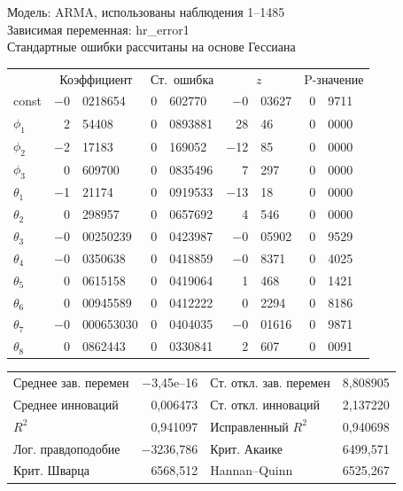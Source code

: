 \documentclass[a4paper,12pt]{article}
\begin{document}
\begin{table}[H]
	\begin{center}
		
		Модель: ARMA, использованы наблюдения 1--1485\\
		Зависимая переменная: hr\_error1\\
		Стандартные ошибки рассчитаны на основе Гессиана
		
		\vspace{1em}
		
		\begin{tabular}{lr@{,}lr@{,}lr@{,}lr@{,}l}
			&
			\multicolumn{2}{c}{Коэффициент} &
			\multicolumn{2}{c}{Ст.\ ошибка} &
			\multicolumn{2}{c}{$z$} &
			\multicolumn{2}{c}{P-значение} \\[1ex]
			const &
			$-$0&0218654 &
			0&602770 &
			$-$0&03627 &
			0&9711 \\
			$\phi_{1}$ &
			2&54408 &
			0&0893881 &
			28&46 &
			0&0000 \\
			$\phi_{2}$ &
			$-$2&17183 &
			0&169052 &
			$-$12&85 &
			0&0000 \\
			$\phi_{3}$ &
			0&609700 &
			0&0835496 &
			7&297 &
			0&0000 \\
			$\theta_{1}$ &
			$-$1&21174 &
			0&0919533 &
			$-$13&18 &
			0&0000 \\
			$\theta_{2}$ &
			0&298957 &
			0&0657692 &
			4&546 &
			0&0000 \\
			$\theta_{3}$ &
			$-$0&00250239 &
			0&0423987 &
			$-$0&05902 &
			0&9529 \\
			$\theta_{4}$ &
			$-$0&0350638 &
			0&0418859 &
			$-$0&8371 &
			0&4025 \\
			$\theta_{5}$ &
			0&0615158 &
			0&0419064 &
			1&468 &
			0&1421 \\
			$\theta_{6}$ &
			0&00945589 &
			0&0412222 &
			0&2294 &
			0&8186 \\
			$\theta_{7}$ &
			$-$0&000653030 &
			0&0404035 &
			$-$0&01616 &
			0&9871 \\
			$\theta_{8}$ &
			0&0862443 &
			0&0330841 &
			2&607 &
			0&0091 \\
		\end{tabular}
		
		\vspace{1ex}
		\begin{tabular}{lrlr}
			Среднее зав. перемен & $-$3,45\textrm{e--16} & Ст. откл. зав. перемен &  8,808905 \\
			Среднее инноваций &  0,006473 & Ст. откл. инноваций &  2,137220 \\
			$R^2$ &  0,941097 & Исправленный $R^2$ &  0,940698 \\
			Лог. правдоподобие & $-$3236,786 & Крит. Акаике &  6499,571 \\
			Крит. Шварца &  6568,512 & Hannan--Quinn &  6525,267 \\
		\end{tabular}
		

\end{center}
\end{table}
\end{document}
